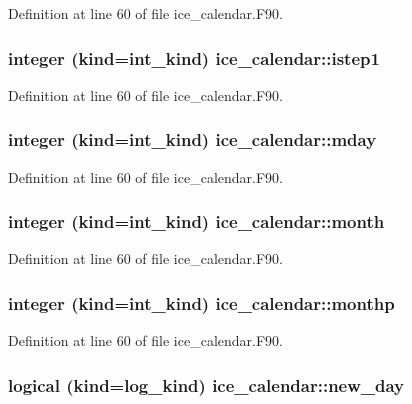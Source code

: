 Definition at line 60 of file ice\_\-calendar.F90.\hypertarget{namespaceice__calendar_a56f19d1b69c0acd3d8fd3a6f06855e48}{
\subsubsection[{istep1}]{\setlength{\rightskip}{0pt plus 5cm}integer (kind=int\_\-kind) {\bf ice\_\-calendar::istep1}}}
\label{namespaceice__calendar_a56f19d1b69c0acd3d8fd3a6f06855e48}


Definition at line 60 of file ice\_\-calendar.F90.\hypertarget{namespaceice__calendar_af65b8e64abed62d107827ade781bb968}{
\subsubsection[{mday}]{\setlength{\rightskip}{0pt plus 5cm}integer (kind=int\_\-kind) {\bf ice\_\-calendar::mday}}}
\label{namespaceice__calendar_af65b8e64abed62d107827ade781bb968}


Definition at line 60 of file ice\_\-calendar.F90.\hypertarget{namespaceice__calendar_a97f8410cf5a5f94b8c2a271c080c4bd7}{
\subsubsection[{month}]{\setlength{\rightskip}{0pt plus 5cm}integer (kind=int\_\-kind) {\bf ice\_\-calendar::month}}}
\label{namespaceice__calendar_a97f8410cf5a5f94b8c2a271c080c4bd7}


Definition at line 60 of file ice\_\-calendar.F90.\hypertarget{namespaceice__calendar_a2e88fbbaa94dea7baf4d46c950c5be7a}{
\subsubsection[{monthp}]{\setlength{\rightskip}{0pt plus 5cm}integer (kind=int\_\-kind) {\bf ice\_\-calendar::monthp}}}
\label{namespaceice__calendar_a2e88fbbaa94dea7baf4d46c950c5be7a}


Definition at line 60 of file ice\_\-calendar.F90.\hypertarget{namespaceice__calendar_a766cb3e9a2b5b634a04a558bade2457c}{
\subsubsection[{new\_\-day}]{\setlength{\rightskip}{0pt plus 5cm}logical (kind=log\_\-kind) {\bf ice\_\-calendar::new\_\-day}}}
\label{namespaceice__calendar_a766cb3e9a2b5b634a04a558bade2457c}


